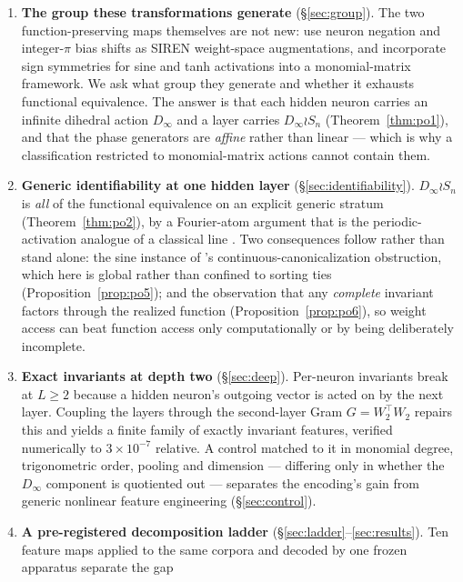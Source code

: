 \documentclass[10pt,letterpaper]{article}
\theoremstyle{definition}
\newcommand{\Dinf}{D_\infty}
\begin{document}
\begin{enumerate}\itemsep2pt
\item \textbf{The group these transformations generate} (\S\ref{sec:group}). The two
function-preserving maps themselves are not new: \citet{shamsian2024augmentations} use neuron
negation and integer-$\pi$ bias shifts as SIREN weight-space augmentations, and
\citet{tran2024monomial} incorporate sign symmetries for sine and tanh activations into a
monomial-matrix framework. We ask what group they generate and whether it exhausts functional
equivalence. The answer is that each hidden neuron carries an infinite dihedral action $\Dinf$ and
a layer carries $\Dinf \wr S_n$ (Theorem~\ref{thm:po1}), and that the phase generators are
\emph{affine} rather than linear --- which is why a classification restricted to monomial-matrix
actions cannot contain them.
\item \textbf{Generic identifiability at one hidden layer} (\S\ref{sec:identifiability}).
$\Dinf \wr S_n$ is \emph{all} of the functional equivalence on an explicit generic stratum
(Theorem~\ref{thm:po2}), by a Fourier-atom argument that is the periodic-activation analogue of a
classical line \citep{hechtnielsen1990algebraic,sussmann1992uniqueness,fefferman1994reconstructing}.
Two consequences follow rather than stand alone: the sine instance of
\citeauthor{dym2024impossibility}'s continuous-canonicalization obstruction, which here is global
rather than confined to sorting ties (Proposition~\ref{prop:po5}); and the observation that any
\emph{complete} invariant factors through the realized function
(Proposition~\ref{prop:po6}), so weight access can beat function access only computationally or by
being deliberately incomplete.
\item \textbf{Exact invariants at depth two} (\S\ref{sec:deep}). Per-neuron invariants break at
$L\ge 2$ because a hidden neuron's outgoing vector is acted on by the next layer. Coupling the
layers through the second-layer Gram $G = W_2^\top W_2$ repairs this and yields a finite family
of exactly invariant features, verified numerically to $3\times10^{-7}$ relative. A control
matched to it in monomial degree, trigonometric order, pooling and dimension --- differing only in
whether the $\Dinf$ component is quotiented out --- separates the encoding's gain from generic
nonlinear feature engineering (\S\ref{sec:control}).
\item \textbf{A pre-registered decomposition ladder} (\S\ref{sec:ladder}--\ref{sec:results}). Ten
feature maps applied to the same corpora and decoded by one frozen apparatus separate the gap

\end{enumerate}
\end{document}
